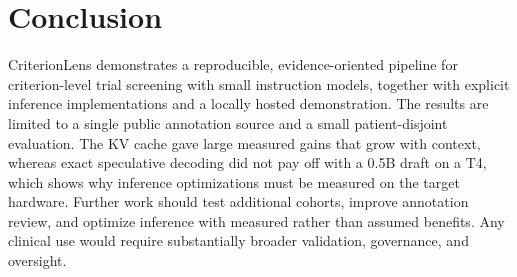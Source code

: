 \section{Conclusion}
CriterionLens demonstrates a reproducible, evidence-oriented pipeline for criterion-level trial screening with small instruction models, together with explicit inference implementations and a locally hosted demonstration. The results are limited to a single public annotation source and a small patient-disjoint evaluation. The KV cache gave large measured gains that grow with context, whereas exact speculative decoding did not pay off with a 0.5B draft on a T4, which shows why inference optimizations must be measured on the target hardware. Further work should test additional cohorts, improve annotation review, and optimize inference with measured rather than assumed benefits. Any clinical use would require substantially broader validation, governance, and oversight.
